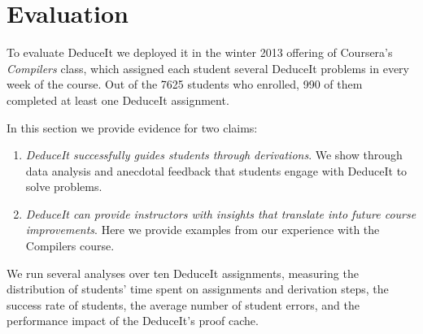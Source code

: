\documentclass{sigchi}
\begin{document}
\section{Evaluation}

To evaluate DeduceIt we deployed it in the winter 2013 offering of Coursera's \textit{Compilers} class, which assigned each student several DeduceIt problems in every week of the course. Out of the 7625 students who enrolled, 990 of them completed at least one DeduceIt assignment. %

In this section we provide evidence for two claims:

\begin{enumerate}
  \item \textit{DeduceIt successfully guides students through derivations}. We show through data analysis and anecdotal feedback that students engage with DeduceIt to solve problems.
  \item \textit{DeduceIt can provide instructors with insights that translate into future course improvements}. Here we provide examples from our experience with the Compilers course. 
\end{enumerate}
  
We run several analyses over ten DeduceIt assignments, measuring the distribution of students' time spent on assignments and derivation steps, the success rate of students, the average number of student errors, and the performance impact of the DeduceIt's proof cache.
\end{document}
